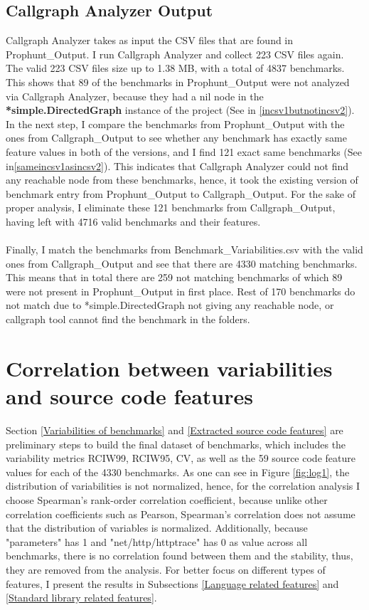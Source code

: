 \documentclass{seal_thesis}
\begin{document}
\subsection{Callgraph Analyzer Output}
Callgraph Analyzer takes as input the CSV files that are found in Prophunt\_Output. I run Callgraph Analyzer and collect 223 CSV files again. The valid 223 CSV files size up to 1.38 MB, with a total of 4837 benchmarks. This shows that 89 of the benchmarks in Prophunt\_Output were not analyzed via Callgraph Analyzer, because they had a nil node in the \textbf{*simple.DirectedGraph} instance of the project (See in \ref{incsv1butnotincsv2}). In the next step, I compare the benchmarks from Prophunt\_Output with the ones from Callgraph\_Output to see whether any benchmark has exactly same feature values in both of the versions, and I find 121 exact same benchmarks (See in\ref{sameincsv1asincsv2}). This indicates that Callgraph Analyzer could not find any reachable node from these benchmarks, hence, it took the existing version of benchmark entry from Prophunt\_Output to Callgraph\_Output. For the sake of proper analysis, I eliminate these 121 benchmarks from Callgraph\_Output, having left with 4716 valid benchmarks and their features.\\
\\
Finally, I match the benchmarks from Benchmark\_Variabilities.csv with the valid ones from Callgraph\_Output and see that there are 4330 matching benchmarks. This means that in total there are 259 not matching benchmarks of which 89 were not present in Prophunt\_Output in first place. Rest of 170 benchmarks do not match due to *simple.DirectedGraph not giving any reachable node, or callgraph tool cannot find the benchmark in the folders. 


\section{Correlation between variabilities and source code features}
\label{Correlation results}

Section \ref{Variabilities of benchmarks} and \ref{Extracted source code features} are preliminary steps to build the final dataset of benchmarks, which includes the variability metrics RCIW99, RCIW95, CV, as well as the 59 source code feature values for each of the 4330 benchmarks. As one can see in Figure \ref{fig:log1}, the distribution of variabilities is not normalized, hence, for the correlation analysis I choose Spearman's rank-order correlation coefficient, because unlike other correlation coefficients such as Pearson, Spearman's correlation does not assume that the distribution of variables is normalized. Additionally, because "parameters" has 1 and "net/http/httptrace" has 0 as value across all benchmarks, there is no correlation found between them and the stability, thus, they are removed from the analysis. For better focus on different types of features, I present the results in Subsections \ref{Language related features} and \ref{Standard library related features}. 
\end{document}
